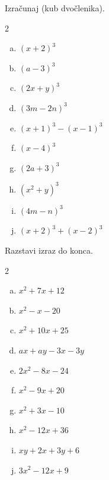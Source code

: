 \documentclass[a4paper,12pt]{letter}
\newcounter{tocke}
\begin{document}
\begin{naloga}[\hfill $\tockeD$] \addtocounter{tocke}{\numexpr\tockeD\relax}
Izra\v{c}unaj (kub dvo\v{c}lenika).
\begin{multicols}{2}
\begin{enumerate}[a)]
\item $\displaystyle (x+2)^3$
\item $\displaystyle (a-3)^3$
\item $\displaystyle (2x+y)^3$
\item $\displaystyle (3m-2n)^3$
\item $\displaystyle (x+1)^3-(x-1)^3$
\end{enumerate}
\columnbreak
\begin{enumerate}[a)]\setcounter{enumi}{5}
\item $\displaystyle (x-4)^3$
\item $\displaystyle (2a+3)^3$
\item $\displaystyle (x^2+y)^3$
\item $\displaystyle (4m-n)^3$
\item $\displaystyle (x+2)^3+(x-2)^3$
\end{enumerate}
\end{multicols}
\end{naloga}

\begin{naloga}[\hfill $\tockeE$] \addtocounter{tocke}{\numexpr\tockeE\relax}
Razstavi izraz do konca.
\begin{multicols}{2}
\begin{enumerate}[a)]
\item $\displaystyle x^2+7x+12$
\item $\displaystyle x^2-x-20$
\item $\displaystyle x^2+10x+25$
\item $\displaystyle ax+ay-3x-3y$
\item $\displaystyle 2x^2-8x-24$
\end{enumerate}
\columnbreak
\begin{enumerate}[a)]\setcounter{enumi}{5}
\item $\displaystyle x^2-9x+20$
\item $\displaystyle x^2+3x-10$
\item $\displaystyle x^2-12x+36$
\item $\displaystyle xy+2x+3y+6$
\item $\displaystyle 3x^2-12x+9$
\end{enumerate}
\end{multicols}
\end{naloga}
\end{document}
